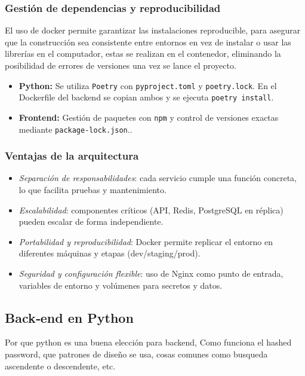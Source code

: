 \documentclass[12pt, a4paper]{article}
\begin{document}
\subsubsection{Gestión de dependencias y reproducibilidad}

El uso de docker permite garantizar las instalaciones reproducible, para asegurar que la construcción sea consistente entre entornos en vez de instalar o usar las librerías en el computador, estas se realizan en el contenedor, eliminando la posibilidad de errores de versiones una vez se lance el proyecto.

\begin{itemize}
	\item \textbf{Python:} Se utiliza \texttt{Poetry} con \texttt{pyproject.toml} y \texttt{poetry.lock}. En el Dockerfile del backend se copian ambos y se ejecuta \texttt{poetry install}.
	\item \textbf{Frontend:} Gestión de paquetes con \texttt{npm} y control de versiones exactas mediante \texttt{package-lock.json}..
\end{itemize}

\subsubsection{Ventajas de la arquitectura}
\begin{itemize}
	\item \emph{Separación de responsabilidades}: cada servicio cumple una función concreta, lo que facilita pruebas y mantenimiento.
	\item \emph{Escalabilidad}: componentes críticos (API, Redis, PostgreSQL en réplica) pueden escalar de forma independiente.
	\item \emph{Portabilidad y reproducibilidad}: Docker permite replicar el entorno en diferentes máquinas y etapas (dev/staging/prod).
	\item \emph{Seguridad y configuración flexible}: uso de Nginx como punto de entrada, variables de entorno y volúmenes para secretos y datos.
\end{itemize}


\subsection{Back‑end en Python} Por que python es una buena elección para backend, Como funciona el hashed password, que patrones de diseño se usa, cosas comunes como busqueda ascendente o descendente, etc.
\end{document}
